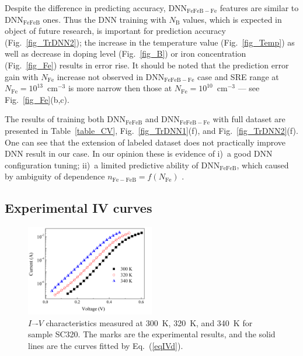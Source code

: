\documentclass[num-refs]{wiley-article} %
\begin{document}
Despite the difference in predicting accuracy,
DNN$_\mathrm{FeFeB-Fe}$ features are similar to DNN$_\mathrm{FeFeB}$ ones.
Thus
the DNN training with $N_\mathrm{B}$ values, which is expected in object of future research,
is important for prediction accuracy (Fig.~\ref{fig_TrDNN2});
the increase in the temperature value (Fig.~\ref{fig_Temp}) as well as decrease
in doping level (Fig.~\ref{fig_B}) or iron concentration (Fig.~\ref{fig_Fe})
results in error rise.
It should be noted that the prediction error gain with $N_\mathrm{Fe}$ increase not observed in DNN$_\mathrm{FeFeB-Fe}$ case and SRE range at $N_\mathrm{Fe}=10^{13}$~cm$^{-3}$ is more narrow then those at $N_\mathrm{Fe}=10^{10}$~cm$^{-3}$ --- see Fig.~\ref{fig_Fe}(b,c).

The results of training both DNN$_\mathrm{FeFeB}$ and DNN$_\mathrm{FeFeB-Fe}$ with full dataset
are presented in Table~\ref{table_CV}, Fig.~\ref{fig_TrDNN1}(f), and Fig.~\ref{fig_TrDNN2}(f).
One can see that the extension of labeled dataset does not practically improve DNN result in our case.
In our opinion these is evidence of
i)~a good DNN configuration tuning;
ii)~a limited predictive ability of DNN$_\mathrm{FeFeB}$,
which caused by ambiguity of dependence $n_\mathrm{Fe-FeB}=f(N_\mathrm{Fe})$ .

\subsection{Experimental IV curves}

\cite{2021CMLTP,FeBAssJAP2014,FeBKin2019}

\begin{figure}[t]
\centering
\includegraphics[width=0.5\textwidth]{F9}
\caption{
$I$–-$V$ characteristics measured at 300~K, 320~K, and 340~K for
sample SC320.
The marks are the experimental results, and
the solid lines are the curves fitted by
Eq.~(\ref{eqIVd}).
}
\label{fig_IVexp}
\end{figure}
\end{document}
